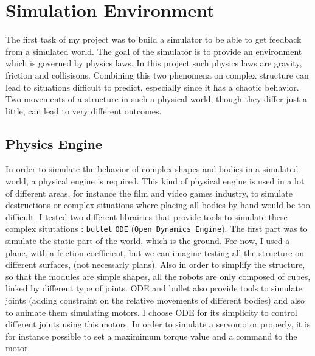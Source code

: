 
\chapter{Simulation Environment} %

\label{Chapter 2} %


The first task of my project was to build a simulator to be able to get feedback from a simulated world. The goal of the simulator is to provide an environment which is governed by physics laws. In this project such physics laws are gravity, friction and collisisons. Combining this two phenomena on complex structure can lead to situations difficult to predict, especially since it has a chaotic behavior. Two movements of a structure in such a physical world, though they differ just a little, can lead to very different outcomes.  

\section{Physics Engine}

In order to simulate the behavior of complex shapes and bodies in a simulated world, a physical engine is required. This kind of physical engine is used in a lot of different areas, for instance the film and video games industry, to simulate destructions or complex situations where placing all bodies by hand would be too difficult. I tested two different librairies that provide tools to simulate these complex situtations : \verb?bullet? \verb?ODE? (\verb?Open Dynamics Engine?). The first part was to simulate the static part of the world, which is the ground. For now, I used a plane, with a friction coefficient, but we can imagine testing all the structure on different surfaces, (not necessarly plans). Also in order to simplify the structure, so that the modules are simple shapes, all the robots are only composed of cubes, linked by different type of joints. ODE and bullet also provide tools to simulate joints (adding constraint on the relative movements of different bodies) and also to animate them simulating motors. I choose ODE for its simplicity to control different joints using this motors. In order to simulate a servomotor properly, it is for instance possible to set a maximimum torque value and a command to the motor.

